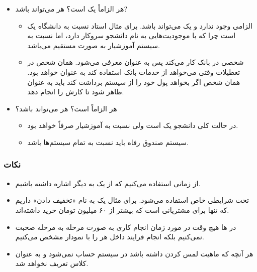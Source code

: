 \begin{itemize}
    \item هر  الزاماً یک  است؟ هر 
    می‌تواند  باشد?
    \begin{itemize}
        \item الزامی وجود ندارد و یک  می‌تواند 
        باشد. برای مثال استاد نسبت به دانشگاه یک  است چرا که
        با موجودیت‌هایی به نام دانشجو سروکار دارد، اما نسبت به سیستم آموزشیار به
        صورت مستقیم  می‌باشد.
        \item شخصی در بانک کار می‌کند پس به عنوان  معرفی
        می‌شود. همان شخص در تعطیلات وقتی می‌خواهد از خدمات بانک استفاده کند به
        عنوان  خواهد بود. همان شخص اگر بخواهد پول خود را از سیستم
        برداشت کند باید به عنوان  ظاهر شود تا کارش را انجام
        دهد.
    \end{itemize}
    \item هر  الزاماً  است؟ هر  می‌تواند
     باشد؟
    \begin{itemize}
        \item در حالت کلی دانشجو یک  است ولی نسبت به
        آموزشیار صرفاً  خواهد بود.
        \item سیستم صندوق رفاه باید نسبت به تمام سیستم‌ها  باشد.
    \end{itemize}
\end{itemize}

\subsubsection*{نکات}

\begin{itemize}
    \item از  زمانی استفاده می‌کنیم که از یک  به
     دیگر اشاره داشته باشیم.
    \item {} تحت شرایطی خاص استفاده می‌شود. برای مثال یک  به
    نام «تخفیف دادن» داریم که تنها برای مشتریانی است که بیشتر از ۶۰ میلیون تومان
    خرید داشته‌اند.
    \item در ‌ها هیچ وقت در مورد زمان انجام کاری به صورت مرحله به
    مرحله صحبت نمی‌کنیم بلکه انجام فرایند داخل هر  را با نمودار
     مشخص می‌کنیم.
    \item هر آنچه که ماهیت لمس کردن داشته باشد در سیستم حساب نمی‌شود و به عنوان
    کلاس تعریف نخواهد شد.
\end{itemize}